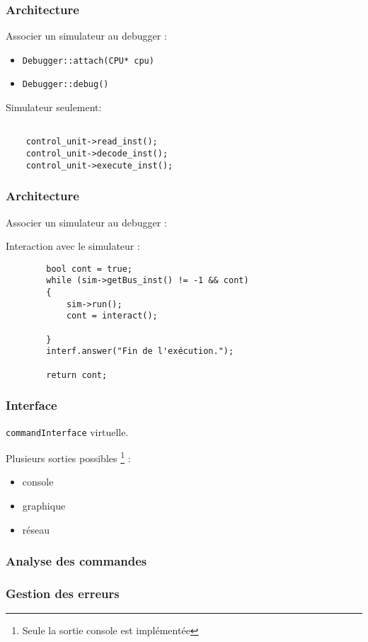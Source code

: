 \documentclass{beamer}
\begin{document}
\begin{frame}[fragile]
	\frametitle{Architecture}
	Associer un simulateur au debugger :

		\begin{itemize}
	\item \verb|Debugger::attach(CPU* cpu)|
	\item \verb|Debugger::debug()|
	\end{itemize}
	
	\begin{block}{Simulateur seulement:}
		\begin{verbatim}
			
    control_unit->read_inst();
    control_unit->decode_inst();
    control_unit->execute_inst();	
		\end{verbatim}
	\end{block}

\end{frame}

\begin{frame}[fragile]
	\frametitle{Architecture}
	Associer un simulateur au debugger :
	\begin{block}{Interaction avec le simulateur :}
	\begin{verbatim}
        bool cont = true;
        while (sim->getBus_inst() != -1 && cont)
        {
            sim->run();
            cont = interact();
            
        }
        interf.answer("Fin de l'exécution.");
        
        return cont;
		\end{verbatim}
	\end{block}
\end{frame}

\begin{frame}[fragile]
	\frametitle{Interface}
	\verb|commandInterface| virtuelle.

	Plusieurs sorties possibles \footnote{Seule la sortie console est implémentée} :
	\begin{itemize}
	\item console
	\item graphique
	\item réseau
	\end{itemize}
\end{frame}

\begin{frame}
	\frametitle{Analyse des commandes}
	
\end{frame}

\begin{frame}
	\frametitle{Gestion des erreurs}
\end{frame}
\end{document}
